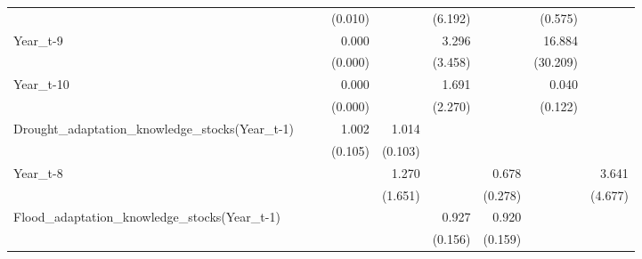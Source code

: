 \begin{table}[htbp]
\begin{tabular}{l*{8}{D{.}{.}{-1}}}
            &                     &                     &     (0.010)         &                     &     (6.192)         &                     &     (0.575)         &                     \\
Year\_t-9    &                     &                     &       0.000         &                     &       3.296         &                     &      16.884         &                     \\
            &                     &                     &     (0.000)         &                     &     (3.458)         &                     &    (30.209)         &                     \\
Year\_t-10   &                     &                     &       0.000         &                     &       1.691         &                     &       0.040         &                     \\
            &                     &                     &     (0.000)         &                     &     (2.270)         &                     &     (0.122)         &                     \\
Drought\_adaptation\_knowledge\_stocks(Year\_t-1)&                     &                     &       1.002         &       1.014         &                     &                     &                     &                     \\
            &                     &                     &     (0.105)         &     (0.103)         &                     &                     &                     &                     \\
Year\_t-8    &                     &                     &                     &       1.270         &                     &       0.678         &                     &       3.641         \\
            &                     &                     &                     &     (1.651)         &                     &     (0.278)         &                     &     (4.677)         \\
Flood\_adaptation\_knowledge\_stocks(Year\_t-1)&                     &                     &                     &                     &       0.927         &       0.920         &                     &                     \\
            &                     &                     &                     &                     &     (0.156)         &     (0.159)         &                     &                     \\

\end{tabular}
\end{table}

